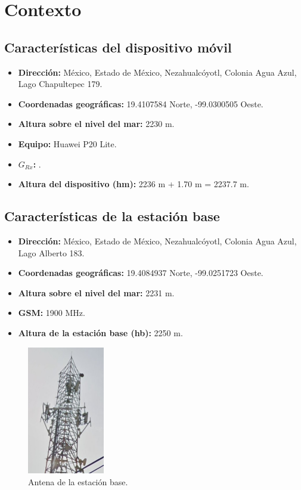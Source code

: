 \documentclass[11pt,letterpaper]{article}
\begin{document}


\newpage
\tableofcontents
\listoffigures
\listoftables

\newpage
\section{Contexto}

\subsection{Características del dispositivo móvil}
\begin{itemize}
    \item \textbf{Dirección: }México, Estado de México, Nezahualcóyotl, Colonia Agua Azul, 
    Lago Chapultepec 179.
    \item \textbf{Coordenadas geográficas: }19.4107584 Norte, -99.0300505 Oeste.
    \item \textbf{Altura sobre el nivel del mar: }2230 m.
    \item \textbf{Equipo: }Huawei P20 Lite.
    \item \textbf{$G_{Rx}$: }.
    \item \textbf{Altura del dispositivo (hm): }2236 m + 1.70 m = 2237.7 m.
\end{itemize}

\subsection{Características de la estación base}
\begin{itemize}
    \item \textbf{Dirección: }México, Estado de México, Nezahualcóyotl, Colonia Agua Azul, 
    Lago Alberto 183.
    \item \textbf{Coordenadas geográficas: }19.4084937 Norte, -99.0251723 Oeste.
    \item \textbf{Altura sobre el nivel del mar: }2231 m.
    \item \textbf{GSM: }1900 MHz.
    \item \textbf{Altura de la estación base (hb): }2250 m.
\end{itemize}

\begin{figure}[ht]
    \centering
    \includegraphics[width=0.3\textwidth]{imagenes/t11.png}
    \caption{Antena de la estación base.}
\end{figure}
\end{document}
